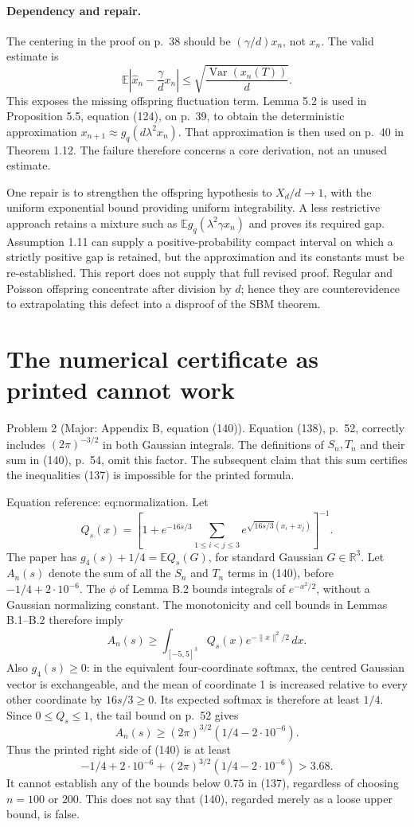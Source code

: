 \documentclass[10pt]{article}
\begin{document}
\paragraph*{Dependency and repair.}\mbox{}\par
The centering in the proof on p. 38 should be \((\gamma/d)x_n\), not \(x_n\). The valid estimate is \[\mathbb E\left|\widehat x_n-\frac{\gamma}{d}x_n\right|
 \leq \sqrt{\frac{\operatorname{Var}(x_n(T))}{d}}.\] This exposes the missing offspring fluctuation term. Lemma 5.2 is used in Proposition 5.5, equation (124), on p. 39, to obtain the deterministic approximation \(x_{n+1}\approx g_q(d\lambda^2x_n)\). That approximation is then used on p. 40 in Theorem 1.12. The failure therefore concerns a core derivation, not an unused estimate.\par
One repair is to strengthen the offspring hypothesis to \(X_d/d\to1\), with the uniform exponential bound providing uniform integrability. A less restrictive approach retains a mixture such as \(\mathbb Eg_q(\lambda^2\gamma x_n)\) and proves its required gap. Assumption 1.11 can supply a positive-probability compact interval on which a strictly positive gap is retained, but the approximation and its constants must be re-established. This report does not supply that full revised proof. Regular and Poisson offspring concentrate after division by \(d\); hence they are counterevidence to extrapolating this defect into a disproof of the SBM theorem.\par
\section*{The numerical certificate as printed cannot work}
Problem 2 (Major: Appendix B, equation (140)).  Equation (138), p. 52, correctly includes \((2\pi)^{-3/2}\) in both Gaussian integrals. The definitions of \(S_n,T_n\) and their sum in (140), p. 54, omit this factor. The subsequent claim that this sum certifies the inequalities (137) is impossible for the printed formula.\par
Equation reference: eq:normalization. Let \[Q_s(x)=\left[1+e^{-16s/3}
       \sum_{1\leq i<j\leq3}e^{\sqrt{16s/3}(x_i+x_j)}
       \right]^{-1}.\] The paper has \(g_4(s)+1/4=\mathbb EQ_s(G)\), for standard Gaussian \(G\in\mathbb R^3\). Let \(A_n(s)\) denote the sum of all the \(S_n\) and \(T_n\) terms in (140), before \(-1/4+2\cdot10^{-6}\). The \(\phi\) of Lemma B.2 bounds integrals of \(e^{-x^2/2}\), without a Gaussian normalizing constant. The monotonicity and cell bounds in Lemmas B.1–B.2 therefore imply \[A_n(s)\geq
 \int_{[-5,5]^3}Q_s(x)e^{-\|x\|^2/2}\,dx.\] Also \(g_4(s)\geq0\): in the equivalent four-coordinate softmax, the centred Gaussian vector is exchangeable, and the mean of coordinate 1 is increased relative to every other coordinate by \(16s/3\geq0\). Its expected softmax is therefore at least \(1/4\). Since \(0\leq Q_s\leq1\), the tail bound on p. 52 gives \[A_n(s)\geq(2\pi)^{3/2}(1/4-2\cdot10^{-6}).\] Thus the printed right side of (140) is at least \[-1/4+2\cdot10^{-6}
 +(2\pi)^{3/2}(1/4-2\cdot10^{-6})>3.68.
 \] It cannot establish any of the bounds below \(0.75\) in (137), regardless of choosing \(n=100\) or \(200\). This does not say that (140), regarded merely as a loose upper bound, is false.\par
\end{document}
